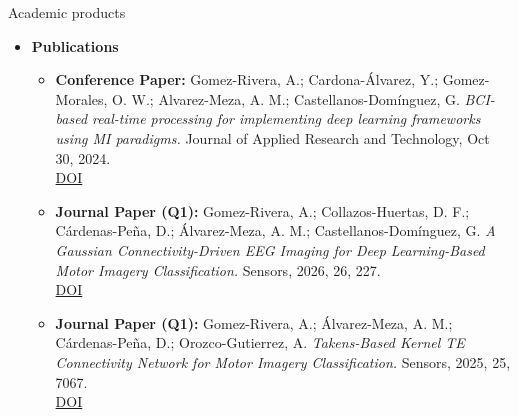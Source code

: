 \documentclass[aspectratio=169]{beamer}
\begin{document}

\begin{frame}{Academic products}
\begin{itemize}
  \item \textbf{Publications}
  \begin{itemize}\itemsep3pt

    \item \textbf{Conference Paper:} Gomez-Rivera, A.; Cardona-Álvarez, Y.; Gomez-Morales, O. W.; Alvarez-Meza, A. M.; Castellanos-Domínguez, G.
    \emph{BCI-based real-time processing for implementing deep learning frameworks using MI paradigms.}
    Journal of Applied Research and Technology, Oct 30, 2024.\\
    \href{https://doi.org/10.22201/icat.24486736e.2024.22.5.2392}{DOI}

    \item \textbf{Journal Paper (Q1):} Gomez-Rivera, A.; Collazos-Huertas, D. F.; Cárdenas-Peña, D.; Álvarez-Meza, A. M.; Castellanos-Domínguez, G.
    \emph{A Gaussian Connectivity-Driven EEG Imaging for Deep Learning-Based Motor Imagery Classification.}
    Sensors, 2026, 26, 227.\\
    \href{https://doi.org/10.3390/s26010227}{DOI}

    \item \textbf{Journal Paper (Q1):} Gomez-Rivera, A.; Álvarez-Meza, A. M.; Cárdenas-Peña, D.; Orozco-Gutierrez, A.
    \emph{Takens-Based Kernel TE Connectivity Network for Motor Imagery Classification.}
    Sensors, 2025, 25, 7067.\\
    \href{https://doi.org/10.3390/s25227067}{DOI}

  \end{itemize}
\end{itemize}
\end{frame}
\end{document}
